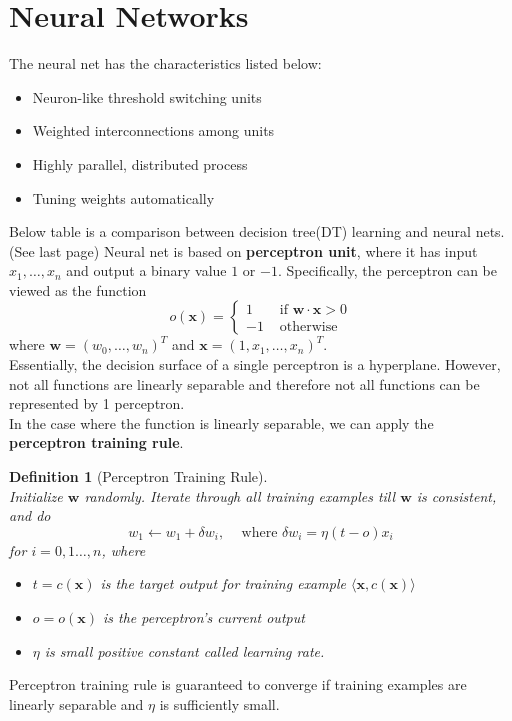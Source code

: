 \documentclass[12pt]{article}
\newtheorem{definition}{Definition}[section]
\theoremstyle{definition}
\begin{document}
\section{Neural Networks}
The neural net has the characteristics listed below:
\begin{itemize}
	\item Neuron-like threshold switching units
	\item Weighted interconnections among units
	\item Highly parallel, distributed process
	\item Tuning weights automatically
\end{itemize}
Below table is a comparison between decision tree(DT) learning and neural nets. (See last page)
Neural net is based on \textbf{perceptron unit}, where it has input $x_1,\ldots, x_n$ and output a binary value $1$ or $-1$. Specifically, the perceptron can be viewed as the function
\[
o(\mathbf{x})=\begin{cases}
1&\text{ if }\mathbf{w}\cdot\mathbf{x}>0\\
-1&\text{ otherwise}
\end{cases}
\]
where $\mathbf{w}=(w_0,\ldots, w_n)^T$ and $\mathbf{x}=(1, x_1,\ldots, x_n)^T$.\\
Essentially, the decision surface of a single perceptron is a hyperplane. However, not all functions are linearly separable and therefore not all functions can be represented by 1 perceptron.\\
In the case where the function is linearly separable, we can apply the \textbf{perceptron training rule}.
\begin{definition}[Perceptron Training Rule]
\hfill\\\normalfont Initialize $\mathbf{w}$ randomly. Iterate through all training examples till $\mathbf{w}$ is consistent, and do
\[
w_1\leftarrow w_1+\delta w_i,\;\;\;\text{ where }\delta w_i = \eta(t-o)x_i
\]
for $i=0,1\ldots, n$, where
\begin{itemize}
	\item $t=c(\mathbf{x})$ is the target output for training example $\langle \mathbf{x}, c(\mathbf{x})\rangle$
	\item $o=o(\mathbf{x})$ is the perceptron's current output
	\item $\eta$ is small positive constant called learning rate.
\end{itemize}
\end{definition}
Perceptron training rule is guaranteed to converge if training examples are linearly separable and $\eta$ is sufficiently small.\\
\end{document}
